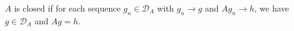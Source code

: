 
$A$ is closed if for each sequence $g_n \in \mathcal{D}_A$ with $g_n \to g$ and $Ag_n \to h$, we have $g \in \mathcal{D}_A$ and $Ag = h$.
